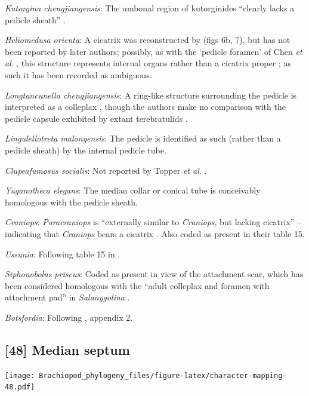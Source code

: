 \documentclass[]{book}
\theoremstyle{definition}
\theoremstyle{definition}
\theoremstyle{definition}
\theoremstyle{remark}
\begin{document}
\emph{Kutorgina chengjiangensis}: The umbonal region of kutorginides
``clearly lacks a pedicle sheath'' \citep{Holmer2018Theattachment}.

\emph{Heliomedusa orienta}: A cicatrix was reconstructed by
\citet{Jin1992Revisionof} (figs 6b, 7), but has not been reported by
later authors; possibly, as with the `pedicle foramen' of Chen \emph{et
al}. \citeyearpar{Chen2007Reinterpretationof}, this structure represents
internal organs rather than a cicatrix proper
\citep{Zhang2009Architectureand}; as such it has been recorded as
ambiguous.

\emph{Longtancunella chengjiangensis}: A ring-like structure surrounding
the pedicle is interpreted as a colleplax
\citep{Zhang2011Theexceptionally}, though the authors make no comparison
with the pedicle capsule exhibited by extant terebratulids
\citep[see][]{Holmer2018Evolutionarysignificance}.

\emph{Lingulellotreta malongensis}: The pedicle is identified as such
(rather than a pedicle sheath) by the internal pedicle tube.

\emph{Clupeafumosus socialis}: Not reported by Topper \emph{et al}.
\citeyearpar{Topper2013Reappraisalof}.

\emph{Yuganotheca elegans}: The median collar or conical tube is
conceivably homologous with the pedicle sheath.

\emph{Craniops}: \emph{Paracraniops} is ``externally similar to
\emph{Craniops}, but lacking cicatrix'' -- indicating that
\emph{Craniops} bears a cicatrix
\citep{Williams2000BrachiopodaLinguliformea}. Also coded as present in
their table 15.

\emph{Ussunia}: Following table 15 in
\citet{Williams2000BrachiopodaLinguliformea}.

\emph{Siphonobolus priscus}: Coded as present in view of the attachment
scar, which has been considered homologous with the ``adult colleplax
and foramen with attachment pad'' in \emph{Salanygolina}
\citep{Popov2009Earlyontogeny}.

\emph{Botsfordia}: Following \citet{Williams1998Thediversity}, appendix
2.

\hypertarget{median-septum}{%
\subsection*{{[}48{]} Median septum}\label{median-septum}}

\texttt{[image: Brachiopod\_phylogeny\_files/figure-latex/character-mapping-48.pdf]}
\end{document}
